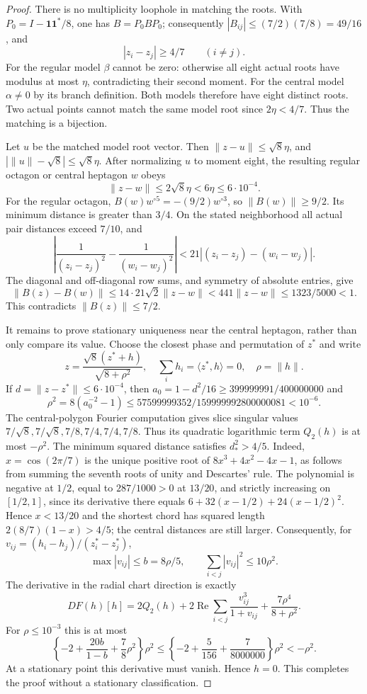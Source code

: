 \documentclass[11pt]{article}
\theoremstyle{remark}
\numberwithin{equation}{section}
\begin{document}
\begin{proof}
There is no multiplicity loophole in matching the roots. With
$P_0=I-\mathbf1\mathbf1^*/8$, one has $B=P_0BP_0$; consequently
$|B_{ij}|\le(7/2)(7/8)=49/16$, and
\[
 |z_i-z_j|\ge4/7\qquad(i\ne j).
\]
For the regular model $\beta$ cannot be zero: otherwise all eight
actual roots have modulus at most $\eta$, contradicting their
second moment. For the central model $\alpha\ne0$ by its branch
definition. Both models therefore have eight distinct roots. Two
actual points cannot match the same model root since
$2\eta<4/7$. Thus the matching is a bijection.

Let $u$ be the matched model root vector. Then
$\|z-u\|\le\sqrt8\eta$, and
$|\|u\|-\sqrt8|\le\sqrt8\eta$. After normalizing $u$ to moment
eight, the resulting regular octagon or central heptagon $w$ obeys
\[
 \|z-w\|\le2\sqrt8\eta<6\eta\le6\cdot10^{-4}.
\]
For the regular octagon, $B(w)w^{\circ5}=-(9/2)w^{\circ3}$, so
$\|B(w)\|\ge9/2$. Its minimum distance is greater than $3/4$.
On the stated neighborhood all actual pair distances exceed $7/10$,
and
\[
 \left|\frac1{(z_i-z_j)^2}-\frac1{(w_i-w_j)^2}\right|
 <21|(z_i-z_j)-(w_i-w_j)|.
\]
The diagonal and off-diagonal row sums, and symmetry of absolute
entries, give
\[
 \|B(z)-B(w)\|\le14\cdot21\sqrt2\|z-w\|
 <441\|z-w\|\le1323/5000<1.
\]
This contradicts $\|B(z)\|\le7/2$.

It remains to prove stationary uniqueness near the central heptagon,
rather than only compare its value. Choose the closest phase and
permutation of $z^*$ and write
\[
 z=\frac{\sqrt8(z^*+h)}{\sqrt{8+\rho^2}},\quad
 \sum_i h_i=\langle z^*,h\rangle=0,\quad \rho=\|h\|.
\]
If $d=\|z-z^*\|\le6\cdot10^{-4}$, then
$a_0=1-d^2/16\ge399999991/400000000$ and
\[
 \rho^2=8(a_0^{-2}-1)
 \le57599999352/159999992800000081<10^{-6}.
\]
The central-polygon Fourier computation gives slice singular values
$7/\sqrt8,7/\sqrt8,7/8,7/4,7/4,7/8$. Thus its quadratic logarithmic
term $Q_2(h)$ is at most $-\rho^2$. The minimum squared distance
satisfies $d_*^2>4/5$. Indeed, $x=\cos(2\pi/7)$ is the unique
positive root of $8x^3+4x^2-4x-1$, as follows from summing the
seventh roots of unity and Descartes' rule. The polynomial is
negative at $1/2$, equal to $287/1000>0$ at $13/20$, and strictly increasing
on $[1/2,1]$, since its derivative there equals
$6+32(x-1/2)+24(x-1/2)^2$. Hence $x<13/20$ and the shortest
chord has squared length $2(8/7)(1-x)>4/5$; the central distances
are still larger. Consequently, for
$v_{ij}=(h_i-h_j)/(z_i^*-z_j^*)$,
\[
 \max|v_{ij}|\le b=8\rho/5,\qquad
 \sum_{i<j}|v_{ij}|^2\le10\rho^2.
\]
The derivative in the radial chart direction is exactly
\[
 DF(h)[h]=2Q_2(h)+2\operatorname{Re}\sum_{i<j}
       \frac{v_{ij}^3}{1+v_{ij}}+\frac{7\rho^4}{8+\rho^2}.
\]
For $\rho\le10^{-3}$ this is at most
\[
 \left\{-2+\frac{20b}{1-b}+\frac78\rho^2\right\}\rho^2
 \le\left\{-2+\frac5{156}+\frac7{8000000}\right\}\rho^2
 <-\rho^2.
\]
At a stationary point this derivative must vanish. Hence $h=0$.
This completes the proof without a stationary classification.
\end{proof}
\end{document}
